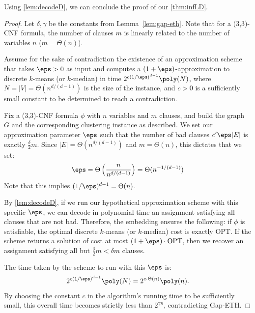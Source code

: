 Using \cref{lem:decodeD}, we can conclude the proof of our \cref{thm:infLD}.
\begin{proof}
Let $\delta, \gamma$ be the constants from Lemma~\ref{lem:gap-eth}. Note that for a (3,3)-CNF formula, the number of clauses $m$ is linearly related to the number of variables $n$ ($m = \Theta(n)$).

Assume for the sake of contradiction the existence of an approximation scheme that takes $\eps > 0$ as input and computes a $(1+\eps)$-approximation to discrete $k$-means (or $k$-median) in time $2^{c(1/\eps)^{d-1}} \poly(N)$, where $N = |V| = \Theta(n^{d/(d-1)})$ is the size of the instance, and $c > 0$ is a sufficiently small constant to be determined to reach a contradiction.

Fix a (3,3)-CNF formula $\phi$ with $n$ variables and $m$ clauses, and build the graph $G$ and the corresponding clustering instance as described. We set our approximation parameter $\eps$ such that the number of bad clauses $c'\eps|E|$ is exactly $\frac{\delta}{2} m$. Since $|E| = \Theta(n^{d/(d-1)})$ and $m = \Theta(n)$, this dictates that we set:
\[ \eps = \Theta\left(\frac{n}{n^{d/(d-1)}}\right) = \Theta(n^{-1/(d-1)}) \]
Note that this implies $(1/\eps)^{d-1} = \Theta(n)$. 

By \cref{lem:decodeD}, if we run our hypothetical approximation scheme with this specific $\eps$, we can decode in polynomial time an assignment satisfying all clauses that are not bad. 
Therefore, the embedding ensures the following: if $\phi$ is satisfiable, the optimal discrete $k$-means (or $k$-median) cost is exactly $\text{OPT}$. If the scheme returns a solution of cost at most $(1+\eps)\cdot\text{OPT}$, then we recover an assignment satisfying all but $\frac{\delta}{2} m < \delta m$ clauses. 

The time taken by the scheme to run with this $\eps$ is:
\[ 2^{c\left(1/\eps\right)^{d-1}} \poly(N) =  2^{c \cdot \Theta(n)} \poly(n). \]
By choosing the constant $c$ in the algorithm's running time to be sufficiently small, this overall time becomes strictly less than $2^{\gamma n}$, contradicting Gap-ETH. 
\end{proof}

